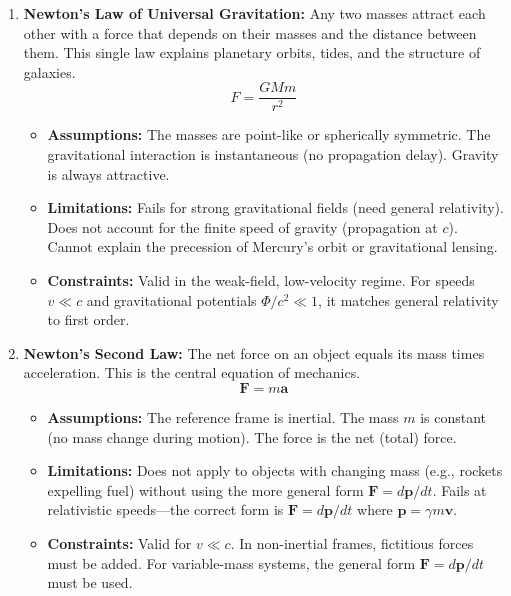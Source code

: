 \documentclass[11pt,openright]{book}
\begin{document}
\begin{enumerate}
\item \textbf{Newton's Law of Universal Gravitation:} Any two masses attract each other with a force that depends on their masses and the distance between them. This single law explains planetary orbits, tides, and the structure of galaxies.
\[
F=\frac{GMm}{r^2}
\]
\begin{itemize}
\item \textbf{Assumptions:} The masses are point-like or spherically symmetric. The gravitational interaction is instantaneous (no propagation delay). Gravity is always attractive.
\item \textbf{Limitations:} Fails for strong gravitational fields (need general relativity). Does not account for the finite speed of gravity (propagation at $c$). Cannot explain the precession of Mercury's orbit or gravitational lensing.
\item \textbf{Constraints:} Valid in the weak-field, low-velocity regime. For speeds $v\ll c$ and gravitational potentials $\Phi/c^2\ll 1$, it matches general relativity to first order.
\end{itemize}

\item \textbf{Newton's Second Law:} The net force on an object equals its mass times acceleration. This is the central equation of mechanics.
\[
\mathbf F=m\mathbf a
\]
\begin{itemize}
\item \textbf{Assumptions:} The reference frame is inertial. The mass $m$ is constant (no mass change during motion). The force is the net (total) force.
\item \textbf{Limitations:} Does not apply to objects with changing mass (e.g., rockets expelling fuel) without using the more general form $\mathbf F=d\mathbf p/dt$. Fails at relativistic speeds---the correct form is $\mathbf F=d\mathbf p/dt$ where $\mathbf p=\gamma m\mathbf v$.
\item \textbf{Constraints:} Valid for $v\ll c$. In non-inertial frames, fictitious forces must be added. For variable-mass systems, the general form $\mathbf F=d\mathbf p/dt$ must be used.
\end{itemize}


\end{enumerate}
\end{document}
